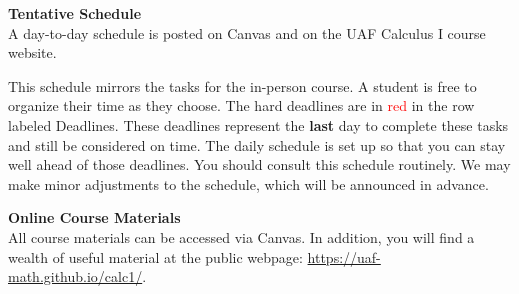 \documentclass[12pt]{article}
\renewcommand{\emph}[1]{\textsf{\textbf{#1}}}
\newcommand{\localhead}[1]{\par\smallskip\textbf{#1}\nobreak\\}%
\def\heading#1{\localhead{\large\emph{#1}}}
\begin{document}
\vspace{.1in}

\heading{Tentative Schedule}
A day-to-day schedule is posted on Canvas and on the UAF Calculus I course website. 

This schedule mirrors the tasks for the in-person course. A student is free to organize their time as they choose. The hard deadlines are in
\textcolor{red}{red} in the row labeled Deadlines. These deadlines represent the \textbf{last} day to complete these tasks
and still be considered on time. The daily schedule is set up so that you can stay well ahead of
those deadlines. You should consult this schedule routinely. We may make minor adjustments to
the schedule, which will be announced in advance.


\vspace{.1in}

\heading{Online Course Materials}
All course materials can be accessed via Canvas. In addition, you will find a wealth of useful material at the public webpage: \href{https://uaf-math.github.io/calc1/}{https://uaf-math.github.io/calc1/}.

\vspace{.1in}

\end{document}
